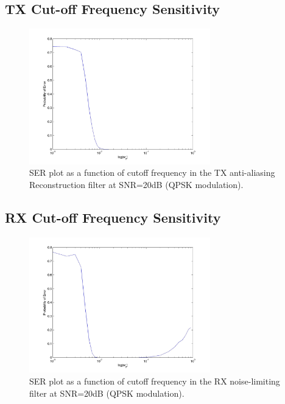 \documentclass[]{article}
\begin{document}
\newpage
\subsection{TX Cut-off Frequency Sensitivity}
\begin{figure}[H]
\centering
\hspace*{-2cm}\includegraphics[width=0.7\textwidth]{freqTX.jpg}
\caption{SER plot as a function of cutoff frequency in the TX anti-aliasing Reconstruction filter at SNR=20dB (QPSK modulation). \label{fig:freqTX}}
\end{figure}

\subsection{RX Cut-off Frequency Sensitivity}
\begin{figure}[H]
\centering
\hspace*{-2cm}\includegraphics[width=0.7\textwidth]{freqRX.jpg}
\caption{SER plot as a function of cutoff frequency in the RX noise-limiting filter at SNR=20dB (QPSK modulation). \label{fig:freqRX}}
\end{figure}
\end{document}
